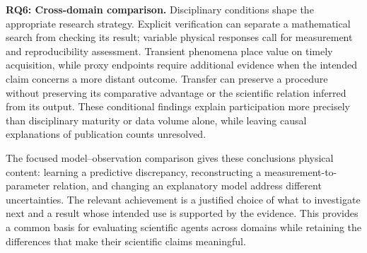 \textbf{RQ6: Cross-domain comparison.} Disciplinary conditions shape the appropriate research strategy. Explicit verification can separate a mathematical search from checking its result; variable physical responses call for measurement and reproducibility assessment. Transient phenomena place value on timely acquisition, while proxy endpoints require additional evidence when the intended claim concerns a more distant outcome. Transfer can preserve a procedure without preserving its comparative advantage or the scientific relation inferred from its output. These conditional findings explain participation more precisely than disciplinary maturity or data volume alone, while leaving causal explanations of publication counts unresolved.

The focused model--observation comparison gives these conclusions physical content: learning a predictive discrepancy, reconstructing a measurement-to-parameter relation, and changing an explanatory model address different uncertainties. The relevant achievement is a justified choice of what to investigate next and a result whose intended use is supported by the evidence. This provides a common basis for evaluating scientific agents across domains while retaining the differences that make their scientific claims meaningful.
